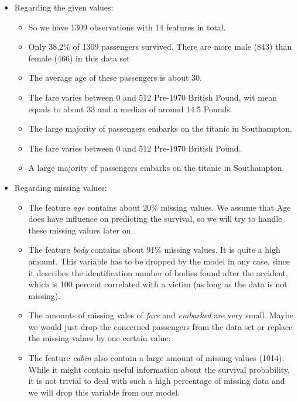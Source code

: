 \documentclass[12,]{article}
\providecommand{\tightlist}{%
  \setlength{\itemsep}{0pt}\setlength{\parskip}{0pt}}
\begin{document}
\begin{itemize}
\tightlist
\item
  Regarding the given values:

  \begin{itemize}
  \tightlist
  \item
    So we have 1309 observations with 14 features in total.
  \item
    Only 38,2\% of 1309 passengers survived. There are more male (843)
    than female (466) in this data set
  \item
    The average age of these passengers is about 30.
  \item
    The fare varies between 0 and 512 Pre-1970 British Pound, wit mean
    equals to about 33 and a median of around 14.5 Pounds.
  \item
    The large majority of passengers embarks on the titanic in
    Southampton.
  \item
    The fare varies between 0 and 512 Pre-1970 British Pound.
  \item
    A large majority of passengers embarks on the titanic in
    Southampton.
  \end{itemize}
\item
  Regarding missing values:

  \begin{itemize}
  \tightlist
  \item
    The feature \emph{age} contains about 20\% missing values. We assume
    that Age does have influence on predicting the survival, so we will
    try to handle these missing values later on.
  \item
    The feature \emph{body} contains about 91\% missing values. It is
    quite a high amount. This variable has to be dropped by the model in
    any case, since it describes the identification number of bodies
    found after the accident, which is 100 percent correlated with a
    victim (as long as the data is not missing).
  \item
    The amounts of missing vales of \emph{fare} and \emph{embarked} are
    very small. Maybe we would just drop the concerned passengers from
    the data set or replace the missing values by one certain value.
  \item
    The feature \emph{cabin} also contain a large amount of missing
    values (1014). While it might contain useful information about the
    survival probability, it is not trivial to deal with such a high
    percentage of missing data and we will drop this variable from our
    model.
  \end{itemize}
\end{itemize}
\end{document}
